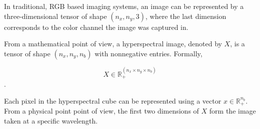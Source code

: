 In traditional, RGB based imaging systems, an image can be represented by a three-dimensional tensor of shape $(n_x, n_y, 3)$, where the last dimension corresponds to the color channel the image was captured in.

From a mathematical point of view, a hyperspectral image, denoted by $X$, is a tensor of shape $(n_x, n_y, n_b)$ with nonnegative entries. Formally, 

$$X \in \mathbb{R}_{+}^{(n_x \times n_y \times n_b)}$$.

Each pixel in the hyperspectral cube can be represented using a vector $x \in \mathbb{R}_+^{n_b}$. From a physical point point of view, the first two dimensions of $X$ form the image taken at a specific wavelength.
 

